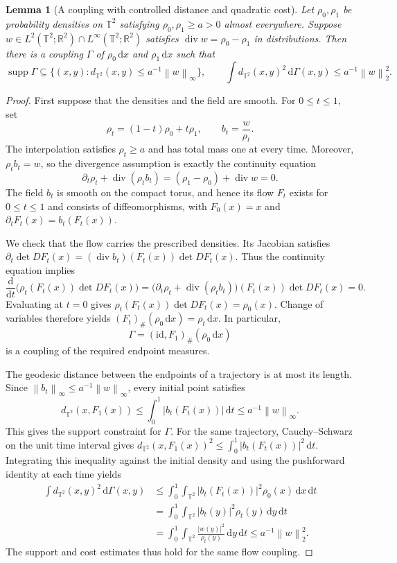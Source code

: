 \documentclass[11pt]{article}
\newcommand{\R}{\mathbb R}
\newcommand{\T}{\mathbb T^2}
\newcommand{\supp}{\operatorname{supp}}
\newcommand{\diver}{\operatorname{div}}
\newcommand{\norm}[1]{\left\lVert #1\right\rVert}
\newtheorem{lemma}[theorem]{Lemma}
\theoremstyle{remark}
\numberwithin{equation}{section}
\begin{document}
\begin{lemma}[A coupling with controlled distance and quadratic cost]
\label{lem:flow}
Let \(\rho_0,\rho_1\) be probability densities on \(\T\) satisfying
\(\rho_0,\rho_1\ge a>0\) almost everywhere. Suppose
\(w\in L^2(\T;\R^2)\cap L^\infty(\T;\R^2)\) satisfies
\(\diver w=\rho_0-\rho_1\) in distributions. Then there is a coupling
\(\Gamma\) of \(\rho_0\,\mathrm dx\) and
\(\rho_1\,\mathrm dx\) such that
\[
 \supp\Gamma\subseteq
 \{(x,y):d_{\T}(x,y)\le a^{-1}\norm w_\infty\},
 \qquad
 \int d_{\T}(x,y)^2\,\mathrm d\Gamma(x,y)
 \le a^{-1}\norm w_2^2.
\]
\end{lemma}

\begin{proof}
First suppose that the densities and the field are smooth. For
\(0\le t\le1\), set
\[
 \rho_t=(1-t)\rho_0+t\rho_1,\qquad
 b_t=\frac{w}{\rho_t}.
\]
The interpolation satisfies \(\rho_t\ge a\) and has total mass one
at every time. Moreover, \(\rho_tb_t=w\), so the divergence assumption
is exactly the continuity equation
\[
 \partial_t\rho_t+\diver(\rho_tb_t)
 =(\rho_1-\rho_0)+\diver w=0.
\]
The field \(b_t\) is smooth on the compact torus, and hence its flow
\(F_t\) exists for \(0\le t\le1\) and consists of diffeomorphisms,
with \(F_0(x)=x\) and
\(\partial_tF_t(x)=b_t(F_t(x))\).

We check that the flow carries the prescribed densities. Its Jacobian
satisfies
\(\partial_t\det DF_t(x)
 =(\diver b_t)(F_t(x))\det DF_t(x)\). Thus the continuity equation
implies
\[
 \frac{\mathrm d}{\mathrm dt}
 \bigl(\rho_t(F_t(x))\det DF_t(x)\bigr)
 =\bigl(\partial_t\rho_t+\diver(\rho_tb_t)\bigr)(F_t(x))
  \det DF_t(x)=0.
\]
Evaluating at \(t=0\) gives
\(\rho_t(F_t(x))\det DF_t(x)=\rho_0(x)\). Change of variables
therefore yields
\((F_t)_\#(\rho_0\,\mathrm dx)=\rho_t\,\mathrm dx\).
In particular,
\[
 \Gamma=(\mathrm{id},F_1)_\#(\rho_0\,\mathrm dx)
\]
is a coupling of the required endpoint measures.

The geodesic distance between the endpoints of a trajectory is at most
its length. Since \(\norm{b_t}_\infty\le a^{-1}\norm w_\infty\),
every initial point satisfies
\[
 d_{\T}(x,F_1(x))
 \le\int_0^1|b_t(F_t(x))|\,\mathrm dt
 \le a^{-1}\norm w_\infty.
\]
This gives the support constraint for \(\Gamma\). For the same
trajectory, Cauchy--Schwarz on the unit time interval gives
\(d_{\T}(x,F_1(x))^2
 \le\int_0^1|b_t(F_t(x))|^2\,\mathrm dt\).
Integrating this inequality against the initial density and using
the pushforward identity at each time yields
\begin{align*}
 \int d_{\T}(x,y)^2\,\mathrm d\Gamma(x,y)
 &\le\int_0^1\int_{\T}
       |b_t(F_t(x))|^2\rho_0(x)\,\mathrm dx\,\mathrm dt\\
 &=\int_0^1\int_{\T}|b_t(y)|^2\rho_t(y)
       \,\mathrm dy\,\mathrm dt\\
 &=\int_0^1\int_{\T}\frac{|w(y)|^2}{\rho_t(y)}
       \,\mathrm dy\,\mathrm dt
 \le a^{-1}\norm w_2^2.
\end{align*}
The support and cost estimates thus hold for the same flow coupling.


\end{proof}
\end{document}
